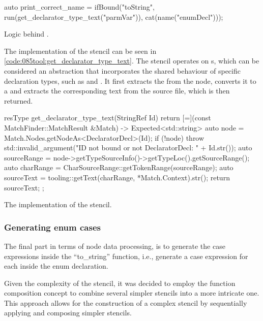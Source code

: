 \begin{listing}[H]
    \begin{cppcode}
auto print_correct_name = ifBound("toString",
    run(get_declarator_type_text("parmVar")),
    cat(name("enumDecl")));
    \end{cppcode}
    \caption{Logic behind .}
    \label{code:085tool:print_correct_name}
\end{listing}

The implementation of the stencil  can be seen in \cref{code:085tool:get_declarator_type_text}.
The stencil operates on s, which can be considered an abstraction that incorporates the shared behaviour of specific declaration types, such as  and .
It first extracts the  from the node, converts it to a  and extracts the corresponding text from the source file, which is then returned.

\begin{listing}[H]
    \begin{cppcode}
resType get_declarator_type_text(StringRef Id) {
return [=](const MatchFinder::MatchResult &Match) -> Expected<std::string> {
    auto node = Match.Nodes.getNodeAs<DeclaratorDecl>(Id);
    if (!node) {
        throw std::invalid_argument("ID not bound or not DeclaratorDecl: " + Id.str());
    }
    auto sourceRange = node->getTypeSourceInfo()->getTypeLoc().getSourceRange();
    auto charRange = CharSourceRange::getTokenRange(sourceRange);
    auto sourceText = tooling::getText(charRange, *Match.Context).str();
    return sourceText;
};
}
    \end{cppcode}
    \caption{The implementation of the  stencil.}
    \label{code:085tool:get_declarator_type_text}
\end{listing}

\subsubsection*{Generating enum cases}
The final part in terms of node data processing, is to generate the case expressions inside the ``to\_string'' function, i.e., generate a case expression for each  inside the enum declaration.

Given the complexity of the stencil, it was decided to employ the function composition concept to combine several simpler stencils into a more intricate one.
This approach allows for the construction of a complex stencil by sequentially applying and composing simpler stencils.

